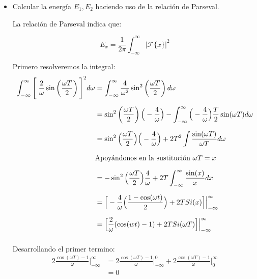 \documentclass[12pt,a4paper]{report}
\begin{document}
\begin{enumerate}[label=\alph*),left=0pt]
\begin {itemize}[left=0pt]
\begin{figure}[h!]
\begin{minipage}{0.45\textwidth}
            \caption{Densidad espectral para $x_2$}
            \label{fig:imagen2}
          \end{minipage}
        \end{figure}

        \textbf{Reflexionar:} ¿La densidad espectral es discreta o continua? ¿El gráfico admite una simetría par, impar
        o ninguna?\\

        La densidad espectral también es una señal de tiempo continuo, y acepta simetría par.\\

      \item Calcular la energía $E_1, E_2$ haciendo uso de la relación de Parseval.

        La relación de Parseval indica que:

        $$E_x=\frac{1}{2\pi}\int_{-\infty}^{\infty}|\mathcal{F}\{x\}|^2$$

        Primero resolveremos la integral:
        $$
        \begin{aligned}
          \int_{-\infty}^{\infty} \Bigg[\hspace{1mm}\frac{2}{\omega} \sin\left(\frac{\omega T}{2}\right)\Bigg]^2 d\omega
          &=\int_{-\infty}^{\infty} \frac{4}{\omega^2} \sin^2\left(\frac{\omega T}{2}\right) d\omega \\[6pt]
          &= \sin^2\left(\frac{\omega T}{2}\right) \Big(-\frac{4}{\omega}\Big) - \int_{-\infty}^{\infty} 
          \Big(-\frac{4}{\omega}\Big) \frac{T}{2} \sin(\omega T)d\omega \\[6pt]
          &= \sin^2\Big(\frac{\omega T}{2}\Big)\Big(-\frac{4}{\omega}\Big) +
            2 T^2 \int \frac{\sin(\omega T)}{\omega T}d\omega \\[6pt]
          &\text{Apoyándonos en la sustitución $\omega T=x$}\\[6pt]
          &=-\sin^2\Big(\frac{\omega T}{2}\Big)\frac{4}{\omega} + 2T \int_{-\infty}^{\infty} \frac{\sin(x)}{x} dx\\[6pt]
          &=\Big[-\frac{4}{\omega} \Big(\frac{1- \cos(\omega t)}{2}\Big) + 2T Si(x)\Big]\Big|_{-\infty}^{\infty}\\[6pt]
          &=\Big[\frac{2}{\omega} (\cos(wt) - 1) + 2T Si(\omega T)\Big]\Big|_{-\infty}^{\infty}\\[6pt]
        \end{aligned}
        $$

        Desarrollando el primer termino:
        $$
        \begin{aligned}
          2\frac{\cos(\omega T)-1}{\omega} \Big|_{-\infty}^{\infty}&=2\frac{\cos(\omega T)-1}{\omega} 
          \Big|_{-\infty}^{0} + 2\frac{\cos(\omega T)-1}{\omega} \Big|_{0}^{\infty}\\[6pt]
          &= 0
        \end{aligned}
        $$


\end{itemize}
\end{enumerate}
\end{document}
